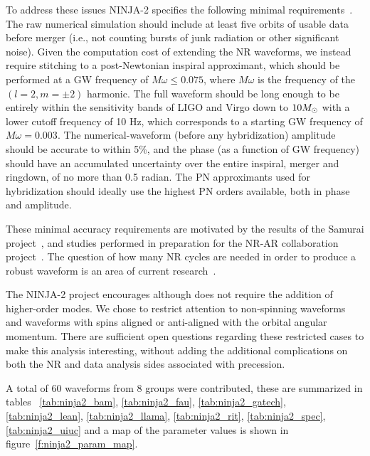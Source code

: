 To address these issues NINJA-2 specifies the following minimal
requirements~\cite{ninja2-wiki}.  The raw numerical simulation should
include at least five orbits of usable data before merger (i.e., not
counting bursts of junk radiation or other significant noise).  Given
the computation cost of extending the NR waveforms, we instead require
stitching to a post-Newtonian inspiral approximant, which should be
performed at a GW frequency of $M\omega \leq 0.075$, where $M\omega$ is
the frequency of the $(l = 2, m = \pm 2)$ harmonic. The full waveform
should be long enough to be entirely within the sensitivity bands of
LIGO and Virgo down to $10 M_\odot$ with a lower cutoff frequency of 10
Hz, which corresponds to a starting GW frequency of $M\omega = 0.003$.
The numerical-waveform (before any hybridization) amplitude should be
accurate to within 5\%, and the phase (as a function of GW frequency)
should have an accumulated uncertainty over the entire inspiral,
merger and ringdown, of no more than 0.5 radian. The PN approximants
used for hybridization should ideally use the highest PN orders
available, both in phase and amplitude.  

These minimal accuracy requirements are motivated by the results of
the Samurai project~\cite{Hannam:2009hh}, and studies performed in
preparation for the NR-AR collaboration project~\cite{ninja-wiki}.
The question of how many NR cycles are needed in order to produce a
robust waveform is an area of current research~\cite{MacDonald:2011}. 

The NINJA-2 project encourages although does not require the addition
of higher-order modes.  We chose to restrict attention to non-spinning
waveforms and waveforms with spins aligned or anti-aligned with the
orbital angular momentum.  There are sufficient open questions
regarding these restricted cases to make this analysis interesting,
without adding the additional complications on both the NR and data
analysis sides associated with precession. 

A total of 60 waveforms from 8 groups were contributed, these are
summarized in tables ~\ref{tab:ninja2_bam}, \ref{tab:ninja2_fau},
\ref{tab:ninja2_gatech}, \ref{tab:ninja2_lean},
\ref{tab:ninja2_llama}, \ref{tab:ninja2_rit}, \ref{tab:ninja2_spec},
\ref{tab:ninja2_uiuc} and a map of the parameter values is shown in
figure~\ref{f:ninja2_param_map}.

